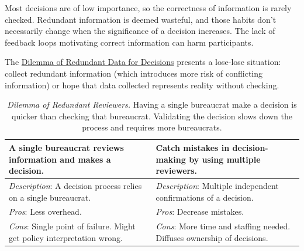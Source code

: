 
Most decisions are of low importance, so the correctness of information is rarely checked. Redundant information is deemed wasteful, and those habits don't necessarily change when the significance of a decision increases. The lack of feedback loops motivating correct information can harm participants.

The \hyperref[table:dilemma-personal-single-bit-decision]{Dilemma of Redundant Data for Decisions} presents a lose-lose situation: collect redundant information (which introduces more risk of conflicting information) or hope that data collected represents reality without checking. 


\begin{center}
\begin{table}[H] %
\begin{tabular}{ | m{\dilemmatablewidth}| m{\dilemmatablewidth} | } 
  \hline
  \textbf{A single bureaucrat reviews information and makes a decision.} & 
  \textbf{Catch mistakes in decision-making by using multiple reviewers.} \\ 
  \hline
  \textit{Description}: A decision process relies on a single bureaucrat. & 
  \textit{Description}: Multiple independent confirmations of a decision.  \\
  \hline
  \textit{Pros}: Less overhead. & 
  \textit{Pros}: Decrease mistakes. \\
  \hline
  \textit{Cons}: Single point of failure. Might get policy interpretation wrong. &
  \textit{Cons}: More time and staffing needed. Diffuses ownership of decisions. \\  
  \hline
\end{tabular}
\caption{
\textit{Dilemma of Redundant Reviewers.}
Having a single bureaucrat make a decision is quicker than checking that bureaucrat. Validating the decision slows down the process and requires more bureaucrats.
}
\label{table:dilemma-personal-redundant-reviewers}
\end{table}
\end{center}

